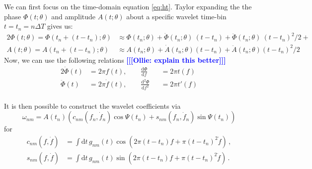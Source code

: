 \documentclass{article}
\newcommand{\ob}[1]{\textcolor{blue}{\bf [[[Ollie: #1]]]}}
\begin{document}
We can first focus on the time-domain equation \eqref{eq:ht}. Taylor expanding the the phase $\Phi(t;\theta)$ and amplitude $A(t;\theta)$ about a specific wavelet time-bin $t=t_n = n\Delta T$ gives us:
\begin{alignat}{2}
    \Phi(t;\theta) = \Phi(t_{n} + (t - t_{n});\theta) &\approx \Phi(t_n;\theta) 
                     + \dot{\Phi}(t_n; \theta)\ (t - t_n) 
                     + \ddot{\Phi}(t_n; \theta)\ (t - t_n)^2/2
                     + \label{eq:phi_taylor_approx} \\
    A(t;\theta) = A(t_{n} + (t - t_{n});\theta) &\approx A(t_n;\theta) + \dot{A}(t_n;\theta)(t-t_n) + \ddot{A}(t_{n};\theta)(t-t_{n})^2/2        
\end{alignat}
Now, we can use the following relations \ob{explain this better}
\begin{alignat*}{2}
\dot{\Phi}(t) &= 2\pi f(t) ,\hspace{2em} \frac{\text{d}\Phi}{\text{d}f} &&= 2\pi t(f) \\
\ddot{\Phi}(t) &= 2\pi \dot{f}(t) ,\hspace{2em} \frac{\text{d}^{2}\Phi}{\text{d}f^{2}} &&= 2\pi t'(f) \\
\end{alignat*}

It is then possible to construct the wavelet coefficients via 
\begin{equation}
\omega_{nm} = A(t_{n})(c_{nm}(f_{n},\dot{f}_{n})\cos\Psi(t_{n}) + s_{nm}(f_{n},\dot{f}_{n})\sin\Psi(t_{n}))
\end{equation}
for
\begin{align}
c_{nm}(f,\dot{f}) &= \int \text{d}t\, g_{nm}(t)\cos(2\pi(t-t_{n})f + \pi(t-t_{n})^2\dot{f})\,, \\
s_{nm}(f,\dot{f})&= \int \text{d}t\,  g_{nm}(t)\sin(2\pi(t-t_{n})f + \pi(t-t_{n})^2\dot{f})\,.
\end{align}
\end{document}
